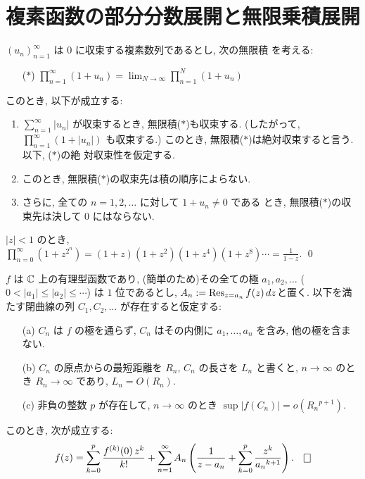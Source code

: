 \documentclass[12pt,twoside]{jarticle}
\begin{document}

\section{複素函数の部分分数展開と無限乗積展開}

\begin{question}[無限積の絶対収束]
  $(u_n)_{n=1}^\infty$ は $0$ に収束する複素数列であるとし, 次の無限積
  を考える:
  \begin{itemize}
  \item[($\ast$)]
    \hfil
    \(\displaystyle
      \prod_{n=1}^\infty (1 + u_n) 
      =
      \lim_{N\to\infty} \prod_{n=1}^N (1 + u_n) 
    \)%
    \hfil
  \end{itemize}
  このとき, 以下が成立する:
  \begin{enumerate}
  \item \(\displaystyle \sum_{n=1}^\infty |u_n| \) が収束するとき, 
    無限積($\ast$)も収束する. %
    (したがって, %
    \(\displaystyle \prod_{n=1}^\infty (1 + |u_n|) \) も収束する.)
    このとき, 無限積($\ast$)は絶対収束すると言う. 以下, ($\ast$)の絶
    対収束性を仮定する. 
  \item このとき, 無限積($\ast$)の収束先は積の順序によらない. 
  \item さらに, 全ての $n = 1,2,\dots$ に対して $1 + u_n \ne 0$ である
    とき, 無限積($\ast$)の収束先は決して $0$ にはならない.
  \end{enumerate}
\end{question}

\begin{question}
  $|z|<1$ のとき, 
  \(\displaystyle
    \prod_{n=0}^\infty (1 + z^{2^n}) 
    =
    (1 + z)(1 + z^2)(1 + z^4)(1 + z^8) \cdots
    =
    \frac{1}{1 - z}.
  \)
  \qed
\end{question}

\begin{question}[有理型函数の部分分数展開]\label{q:bubun-bunsu-tenkai}
  $f$ は ${\mathbb C}$ 上の有理型函数であり, %
  (簡単のため)その全ての極 $a_1, a_2, \dots$ %
  ($0 < |a_1| \le |a_2| \le \cdots$) は $1$ 位であるとし, %
  $\displaystyle A_n := \mathop{\mathrm{Res}}\nolimits_{z=a_n}f(z)\,dz$と置く.  %
  以下を満たす閉曲線の列 $C_1, C_2, \dots$ が存在すると仮定する:
  \begin{itemize}
  \item[(a)] $C_n$ は $f$ の極を通らず, $C_n$ はその内側に 
    $a_1,\dots,a_n$ を含み, 他の極を含まない.
  \item[(b)] $C_n$ の原点からの最短距離を $R_n$, $C_n$ の長さを $L_n$
    と書くと, $n\to\infty$ のとき $R_n\to\infty$ であり, $L_n=O(R_n)$.
  \item[(c)] 非負の整数 $p$ が存在して, $n\to\infty$ のとき 
    $\sup|f(C_n)| = o({R_n}^{p+1})$.
  \end{itemize}
  このとき, 次が成立する:
  \[
    f(z) = 
    \sum_{k=0}^{p} \frac{f^{(k)}(0)\,z^k}{k!}
    + \sum_{n=1}^\infty A_n
      \left( \frac{1}{z - a_n} 
           + \sum_{k=0}^p\frac{z^k}{{a_n}^{k+1}} \right).
    \qed
  \]
\end{question}
\end{document}
